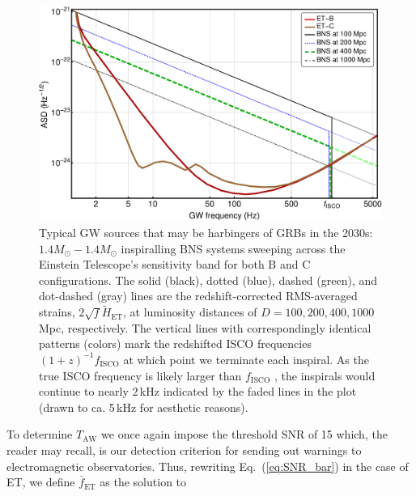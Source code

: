\documentclass[prd,amsmath,amssymb,aps,floats,amsfonts,notitlepage,superscriptaddress,eqsecnum,nofootinbib,10pt]{revtex4-1}
\begin{document}
\begin{figure}[ht!]
\includegraphics[width=\linewidth]{../Figures/ET_strains_redshifted.pdf}
\caption{Typical GW sources that may be harbingers of GRBs in the 2030s: $1.4 M_\odot-1.4 M_\odot$ inspiralling BNS systems sweeping across 
the Einstein Telescope's sensitivity band for both B and C configurations.
The solid (black), dotted (blue), dashed (green), and dot-dashed (gray) lines are the redshift-corrected
RMS-averaged strains, $2\sqrt{f}\tilde{H}_\text{ET}$, at luminosity distances of $D=100, 200, 400, 1000\,$Mpc, respectively. 
The vertical lines with correspondingly identical patterns (colors) mark the redshifted ISCO frequencies $(1+z)^{-1} f_\text{ISCO}$ at which point we terminate each inspiral.
As the true ISCO frequency is likely larger than $f_\text{ISCO}$ \cite{Marronetti:2003hx}, the inspirals would continue to nearly 2\,kHz indicated by the 
faded lines in the plot (drawn to ca. 5\,kHz for aesthetic reasons).
}
\label{fig:ETB2030}
\end{figure}
%
%
To determine $T_\text{AW}$ we once again impose the threshold SNR of 15 which, the reader may recall, 
is our detection criterion for sending out warnings to electromagnetic observatories. Thus, rewriting Eq.~(\ref{eq:SNR_bar}) in the case of ET, we define $\bar{f}_\text{ET}$ as the solution to
\end{document}
